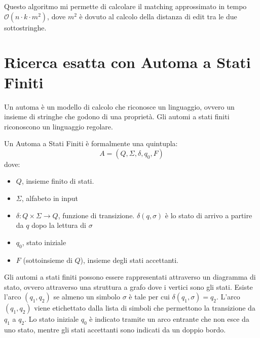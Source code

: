 Questo algoritmo mi permette di calcolare il matching approssimato in tempo $\mathcal{O}(n \cdot k \cdot m^2)$, dove $m^2$ è dovuto al calcolo della distanza di edit tra le due sottostringhe.
\section{Ricerca esatta con Automa a Stati Finiti}
Un automa è un modello di calcolo che riconosce un linguaggio, ovvero un insieme di stringhe che godono di una proprietà. Gli automi a stati finiti riconoscono un linguaggio regolare.
\begin{definizione} 
    Un Automa a Stati Finiti è formalmente una quintupla:
    \begin{equation}
        A = (Q, \Sigma, \delta, q_0, F)
    \end{equation}
    dove:
    \begin{itemize}
        \item $Q$, insieme finito di stati.
        \item $\Sigma$, alfabeto in input
        \item $\delta: Q \times \Sigma \to Q$, funzione di transizione. $\delta(q,\sigma)$ è lo stato di arrivo a partire da $q$ dopo la lettura di $\sigma$
        \item $q_0$, stato iniziale
        \item $F$ (sottoinsieme di $Q$), insieme degli stati accettanti.
    \end{itemize}
\end{definizione}
Gli automi a stati finiti possono essere rappresentati attraverso un diagramma di stato, ovvero attraverso una struttura a grafo dove i vertici sono gli stati. Esiste l'arco $(q_1,q_2)$ se almeno un simbolo $\sigma$ è tale per cui $\delta(q_1,\sigma) = q_2$. L'arco $(q_1,q_2)$ viene etichettato dalla lista di simboli che permettono la transizione da $q_1$ a $q_2$. Lo stato iniziale $q_0$ è indicato tramite un arco entrante che non esce da uno stato, mentre gli stati accettanti sono indicati da un doppio bordo.

